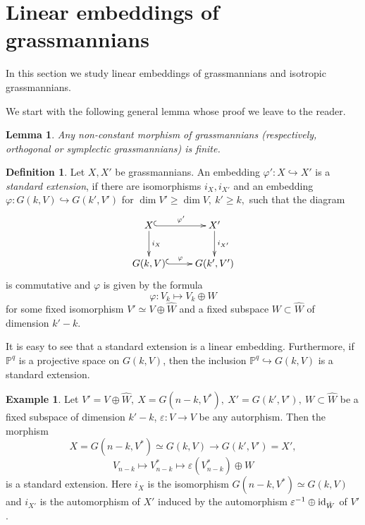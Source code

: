 \documentclass[12pt]{amsart}
\renewcommand{\phi}{\varphi}
\newtheorem{lemma}[theorem]{Lemma}
\theoremstyle{definition}
\newtheorem{definition}[theorem]{Definition}
\newtheorem{example}[theorem]{Example}
\begin{document}
\vspace{1cm}
\section{Linear embeddings of grassmannians}\label{Lin emb}

\vspace{1cm}

In this section we study linear embeddings of grassmannians and isotropic grassmannians.

We start with the following general lemma whose proof we leave to the reader.


\begin{lemma}\label{finite}
Any non-constant morphism of grassmannians (respectively, orthogonal or symplectic grassmannians) is finite.
\end{lemma}


\begin{definition}\label{standard gen}
Let $X,X'$ be grassmannians. An embedding $\phi':X\hookrightarrow X'$
is a \textit{standard extension}, if there are isomorphisms $i_X,i_{X'}$ and an
embedding $\phi:G(k,V)\hookrightarrow G(k',V')$ for $\dim V'\ge\dim V,\ k'\ge k,$ such
that the diagram
\begin{equation}\label{Def 3.1}
\xymatrix{
X \ar@{^{(}->}[r]^-{\phi'}\ar[d]^-{i_X} & X'\ar[d]^-{i_{X'}}\\
G(k,V) \ar@{^{(}->}[r]^-{\phi} & G(k',V') }
\end{equation}
is commutative and $\phi$ is given by the formula
\begin{equation}\label{st ext}
 \phi:V_k\mapsto V_k\oplus W
\end{equation}
for some fixed isomorphism $V'\simeq V\oplus\hat{W}$ and a fixed subspace $W\subset\hat{W}$ of dimension $k'-k$.
\end{definition}


It is easy to see that a standard extension is a linear embedding. Furthermore, if $\mathbb{P}^q$ is a projective space
on $G(k,V)$, then the inclusion $\mathbb{P}^q\hookrightarrow G(k,V)$ is a standard extension.

\begin{example}
Let $V'=V\oplus\hat{W},\ X=G(n-k,V^*),\ X'=G(k',V'),\ W\subset\hat{W}$ be a fixed subspace of dimension $k'-k$,
$\varepsilon: V\to V$ be any autorphism. Then the morphism
$$
X=G(n-k,V^*)\simeq G(k,V)\to G(k',V')=X',
$$
$$
V_{n-k}\mapsto V_{n-k}^*\mapsto\varepsilon(V_{n-k}^*)\oplus W
$$
is a standard extension. Here $i_X$ is the isomorphism $G(n-k,V^*)\simeq G(k,V)$ and $i_{X'}$ is the automorphism
of $X'$ induced by the automorphism $\varepsilon^{-1}\oplus{\rm id}_{\hat{W}}$ of $V'$.
\end{example}
\end{document}
